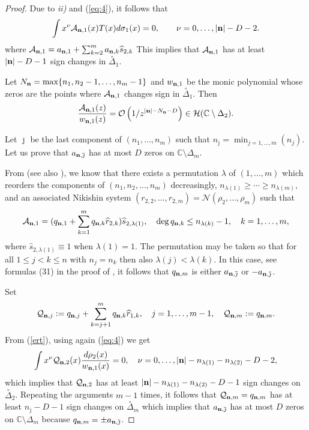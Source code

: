 \documentclass[10pt,a4paper]{article}
\theoremstyle{definition}
\theoremstyle{remark}
\numberwithin{equation}{section}
\begin{document}
\begin{proof}
 Due to \textit{ii)}  and (\ref{eq:4}), it follows that
\[ \int x^{\nu}  \mathcal{A}_{{\bf n},1}(x) T(x) d\sigma_1(x) = 0, \qquad \nu = 0,\ldots, |{\bf n}| -  D -2.
\]
where $\mathcal{A}_{{\bf n},1}=a_{{\bf n},1} + \sum_{k= 2}^m a_{{\bf n},k} \widehat{s}_{2,k}$
This implies that $\mathcal{A}_{{\bf n},1}$ has at least $|{\bf n}|  - D -1$ sign changes in $\stackrel{\circ}{\Delta}_1$. \par




Let $N_{\bf n} = \max\{n_1,n_2-1,\ldots,n_m-1\}$ and
 $w_{{\bf n},1}$ be the monic polynomial whose zeros are the points where $\mathcal{A}_{{\bf n},1}$ changes sign in $\stackrel{\circ}{\Delta}_1$. Then
 \begin{equation}\label{ert}
 \frac{\mathcal{A}_{{\bf n},1}(z)}{w_{{\bf n},1}(z)} = \mathcal{O}\left(1/z^{|{\bf n}|   - N_{\bf n}- D}\right) \in \mathcal{H}(\mathbb{C} \setminus \Delta_2).
\end{equation}

Let $\overline{\jmath}$ be the last component of $(n_1,\ldots,n_m)$ such that $n_{\overline{\jmath}} = \min_{j=1,\ldots,m} (n_j)$.  Let us prove that  $a_{{\bf n},\overline{\jmath}}$ has at most  $D $  zeros on $\mathbb{C}\setminus \Delta_{m} $.


From  \cite[Theorem 1.3]{FL4} (see also \cite[Theorem 3.2]{FL4II}), we know that  there exists a permutation $\lambda$ of $(1,\ldots,m)$ which reorders the components of $(n_1,n_2,\ldots,n_m)$ decreasingly, $n_{\lambda(1)} \geq \cdots \geq n_{\lambda(m)},$ and an associated Nikishin system $(r_{2,2},\ldots,r_{2,m}) = {\mathcal{N}}(\rho_{2},\ldots,\rho_m)$ such that
\[  \mathcal{A}_{{\bf n},1} = (q_{{\bf n},1} + \sum_{k=1}^m q_{{\bf n},k} \widehat{r}_{2,k})\widehat{s}_{2,\lambda(1)}, \quad \deg q_{{\bf n},k} \leq n_{\lambda(k)} -1, \quad k=1,\ldots,m,
\]
where  $\widehat{s}_{2,\lambda(1)} \equiv 1$ when $\lambda(1) = 1$. The permutation may be taken so that for all $1 \leq j <k \leq n$ with $n_j = n_k$ then also $\lambda(j) < \lambda(k)$. In this case,  see formulas (31) in the proof of \cite[Lemma 2.3]{FL4}, it follows that $q_{{\bf n},m}$ is either $a_{{\bf n},\overline{\jmath}}$ or $-a_{{\bf n},\overline{\jmath}}$.

Set
\[\mathcal{Q}_{{\bf n},j} := q_{{\bf n},j} + \sum_{k=j+1}^m q_{{\bf n},k} \widehat{r}_{1,k}, \quad j=1,\ldots,m-1, \quad \mathcal{Q}_{{\bf n},m} := q_{{\bf n},m}.\]
From (\ref{ert}), using again (\ref{eq:4}) we get
\[ \int x^{\nu}  \mathcal{Q}_{{\bf n},2}(x)  \frac{d\rho_2(x)}{w_{{\bf n},1}(x)} = 0, \quad \nu = 0,\ldots, |{\bf n}|  - n_{\lambda(1)}- n_{\lambda(2)} - D -2,
\]
which implies that $\mathcal{Q}_{{\bf n},2}$ has at least $|{\bf n}|  - n_{\lambda(1)}- n_{\lambda(2)} - D -1$ sign changes on $\stackrel{\circ}{\Delta}_2$. Repeating the arguments $m-1$ times, it follows that $\mathcal{Q}_{{\bf n},m} = q_{{\bf n},m}$ has at least $n_{\overline{\jmath}} - D -1$ sign changes on $\stackrel{\circ}{\Delta}_m$ which implies that  $a_{{\bf n},\overline{\jmath}}$ has at most $D$ zeros on   $\mathbb{C}\setminus \Delta_m$ because $q_{{\bf n},m} = \pm a_{{\bf n},\overline{\jmath}}$.




\end{proof}
\end{document}
